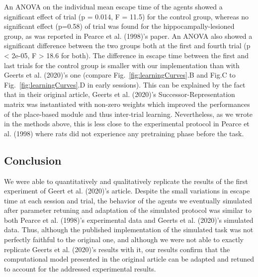 An ANOVA on the individual mean escape time of the agents showed a significant effect of trial (p = 0.014, F = 11.5) for the control group, whereas no  significant effect (p=0.58) of trial was found for the hippocampally-lesioned group, as was reported in Pearce et al. (1998)'s paper. An ANOVA also showed a significant difference between the two groups both at the first and fourth trial (p < 2e-05, F > 18.6 for both). The difference in escape time between the first and last trials for the control group is smaller with our implementation than with Geerts et al. (2020)'s one (compare Fig.~\ref{fig:learningCurves}.B and Fig.C to Fig.~\ref{fig:learningCurves}.D in early sessions). This can be explained by the fact that in their original article, Geerts et al. (2020)'s Successor-Representation matrix was instantiated with non-zero weights which improved the performances of the place-based module and thus inter-trial learning. Nevertheless, as we wrote in the methods above, this is less close to the experimental protocol in Pearce et al. (1998) where rats did not experience any pretraining phase before the task.

\subsection{Conclusion}
We were able to quantitatively and qualitatively replicate the results of the first experiment of Geert et al. (2020)'s article. Despite the small variations in escape time at each session and trial, the behavior of the agents we eventually simulated after parameter retuning and adaptation of the simulated protocol was similar to both Pearce et al. (1998)'s experimental data and Geerts et al. (2020)'s simulated data. Thus, although the published implementation of the simulated task was not perfectly faithful to the original one, and although we were not able to exactly replicate Geerts et al. (2020)'s results with it, our results confirm that the computational model presented in the original article can be adapted and retuned to account for the addressed experimental results.




